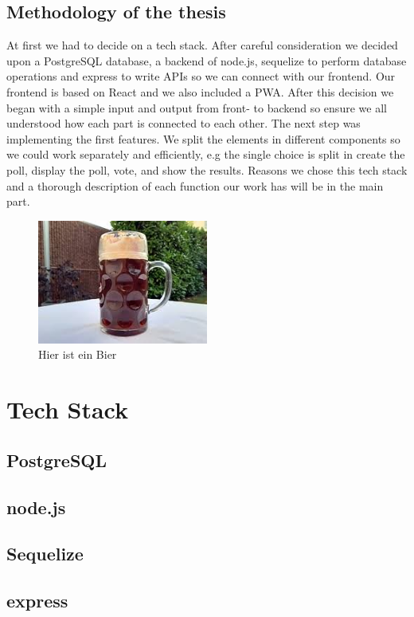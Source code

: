 \documentclass[a4paper,12pt]{report}
\begin{document}
\section{Methodology of the thesis}
At first we had to decide on a tech stack. After careful consideration we decided upon a PostgreSQL database, a backend of node.js, sequelize to perform database operations and express to write APIs so we can connect with our frontend. Our frontend is based on React and we also included a PWA. After this decision we began with a simple input and output from front- to backend so ensure we all understood how each part is connected to each other. The next step was implementing the first features. We split the elements in different components so we could work separately and efficiently, e.g the single choice is split in create the poll, display the poll, vote, and show the results. Reasons we chose this tech stack and a thorough description of each function our work has will be in the main part.  
\begin{figure}[h!]
    \centering
    \includegraphics[width=0.5\textwidth]{beispiel.jpg}
    \caption{Hier ist ein Bier}
    \label{fig:beispielbild}
\end{figure}

\chapter{Tech Stack}
\section{PostgreSQL}
\section{node.js}
\section{Sequelize}
\section{express}
\end{document}

